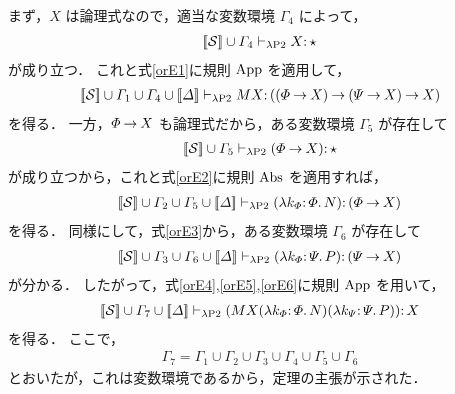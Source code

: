 \documentclass[./main]{subfiles}
\begin{document}
まず，$ X $ は論理式なので，適当な変数環境 $ \varGamma _4 $ によって，
\begin{gather*}
[\![ \mathcal{S} ]\!] \cup \varGamma _4 \vdash _{\lambda \mathrm{P2}} X \mathord{:}\, \mathord{\star}
\end{gather*}
が成り立つ．
これと式\ref{orE1}に規則 $ \mathop{\mathrm{App}}\nolimits $ を適用して，
\begin{gather}
\llbracket \mathscr{S} \rrbracket \cup \varGamma _1 \cup \varGamma _4 \cup \llbracket \varDelta \rrbracket \vdash _{\lam \mathrm{P2}} MX \ocl\, ((\varPhi \bto X) \bto (\varPsi \bto X) \bto X) \label{orE4}
\end{gather}
を得る．
一方，$ \varPhi \mathbin{\to} X $ も論理式だから，ある変数環境 $ \varGamma _5 $ が存在して
\begin{gather*}
[\![ \mathcal{S} ]\!] \cup \varGamma _5 \vdash _{\lambda \mathrm{P2}} (\varPhi \mathbin{\to} X) \mathord{:}\, \mathord{\star}
\end{gather*}
が成り立つから，これと式\ref{orE2}に規則 $ \mathop{\mathrm{Abs}}\nolimits $ を適用すれば，
\begin{gather}
\llbracket \mathscr{S} \rrbracket \cup \varGamma _2 \cup \varGamma _5 \cup \llbracket \varDelta \rrbracket \vdash _{\lam \mathrm{P2}} (\lam k _\varPhi \ocl\, \varPhi.\, N) \ocl\, (\varPhi \bto X) \label{orE5}
\end{gather}
を得る．
同様にして，式\ref{orE3}から，ある変数環境 $ \varGamma _6 $ が存在して
\begin{gather}
\llbracket \mathscr{S} \rrbracket \cup \varGamma _3 \cup \varGamma _6 \cup \llbracket \varDelta \rrbracket \vdash _{\lam \mathrm{P2}} (\lam k _\varPhi \ocl\, \varPsi.\, P) \ocl\, (\varPsi \bto X) \label{orE6}
\end{gather}
が分かる．
したがって，式\ref{orE4},\ats\ref{orE5},\ats\ref{orE6}に規則 $ \mathop{\mathrm{App}}\nolimits $ を用いて，
\begin{gather*}
[\![ \mathcal{S} ]\!] \cup \varGamma _7 \cup [\![ \varDelta ]\!] \vdash _{\lambda \mathrm{P2}} (MX (\lambda k _\varPhi \mathord{:}\, \varPhi.\, N) (\lambda k _\varPsi \mathord{:}\, \varPsi.\, P)) \mathord{:}\, X
\end{gather*}
を得る．
ここで，
\begin{gather*}
\varGamma _7 = \varGamma _1 \cup \varGamma _2 \cup \varGamma _3 \cup \varGamma _4 \cup \varGamma _5 \cup \varGamma _6
\end{gather*}
とおいたが，これは変数環境であるから，定理の主張が示された．

\end{document}
